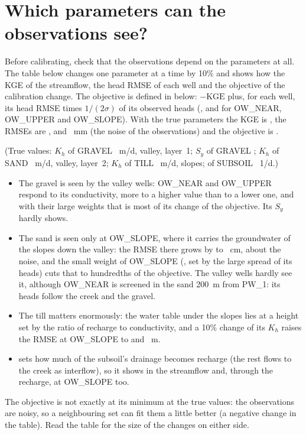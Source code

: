 \section{Which parameters can the observations see?}\label{sec:t6ident}
Before calibrating, check that the observations depend on the parameters at all. The table below changes one parameter at a
time by 10\% and shows how the KGE of the streamflow, the head RMSE of each well and the objective of the calibration
change. The objective is defined in  below: $-\mathrm{KGE}$ plus, for each well, its head RMSE times
$1/(2\sigma)$ of its observed heads (,  and  for OW\_NEAR, OW\_UPPER and OW\_SLOPE).
With the true parameters the KGE is , the RMSEs are ,  and
~mm (the noise of the observations) and the objective is .
\begin{center}\small

\end{center}
(True values: $K_h$ of GRAVEL ~m/d, valley, layer~1; $S_y$ of GRAVEL ; $K_h$ of SAND
~m/d, valley, layer~2; $K_h$ of TILL ~m/d, slopes;  of SUBSOIL
~1/d.)
\begin{itemize}
\item The gravel is seen by the valley wells: OW\_NEAR and OW\_UPPER respond to its conductivity, more to a higher value
      than to a lower one, and with their large weights that is most of its change of the objective. Its $S_y$ hardly shows.
\item The sand is seen only at OW\_SLOPE, where it carries the groundwater of the slopes down the valley: the RMSE there
      grows by  to ~cm, about the noise, and the small weight of OW\_SLOPE
      (, set by the large spread of its heads) cuts that to hundredths of the objective. The valley wells hardly
      see it, although OW\_NEAR is screened in the sand 200~m from PW\_1: its heads follow the creek and the gravel.
\item The till matters enormously: the water table under the slopes lies at a height set by the ratio of recharge to
      conductivity, and a 10\% change of its $K_h$ raises the RMSE at OW\_SLOPE to  and
      ~m.
\item {} sets how much of the subsoil's drainage becomes recharge (the rest flows to the creek as interflow),
      so it shows in the streamflow and, through the recharge, at OW\_SLOPE too.
\end{itemize}
The objective is not exactly at its minimum at the true values: the observations are noisy, so a neighbouring set can fit
them a little better (a negative change in the table). Read the table for the size of the changes on either side.

